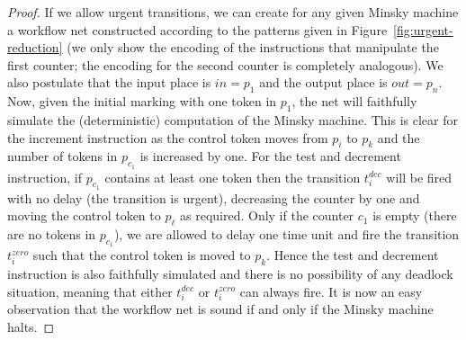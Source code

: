 \begin{proof}
If we allow urgent transitions, we can create for any given Minsky machine
a workflow net constructed according to the patterns given in Figure~\ref{fig:urgent-reduction} (we only show
the encoding of the instructions that manipulate the first counter;
the encoding for the second counter is completely analogous).
We also postulate that the input place is $in=p_1$ and the output place is
$out=p_n$. Now, given the initial marking with one token in $p_1$,
the net will faithfully simulate the (deterministic) computation of
the Minsky machine. This is clear for the increment instruction
as the control token moves from $p_i$ to $p_k$ and the number of tokens
in $p_{c_1}$ is increased by one. For the test and decrement instruction,
if $p_{c_1}$ contains at least one token then the transition
$t_i^{\mathit{dec}}$ will be fired with no delay (the transition is urgent),
decreasing the counter by one and moving the control token to $p_\ell$
as required. Only if the counter $c_1$ is empty (there are no tokens
in $p_{c_1}$), we are allowed to delay one time unit and fire the transition
$t_i^{\mathit{zero}}$ such that the control token is moved to $p_k$.
Hence the test and decrement instruction is also faithfully simulated
and there is no possibility of any deadlock situation, meaning that
either $t_i^{\mathit{dec}}$ or $t_i^{\mathit{zero}}$ can always fire.
It is now an easy observation that the workflow net is sound if and only
if the Minsky machine halts.



\end{proof}
